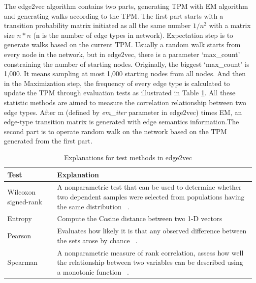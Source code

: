 The edge2vec algorithm contains two parts, generating \ac{TPM} with \ac{EM} algorithm and generating walks according to the \ac{TPM}. The first part starts with a transition probability matrix initiated as all the same number $1/n^2$ with a matrix size $n * n$ (n is the number of edge types in network). Expectation step is to generate walks based on the current \ac{TPM}. Usually a random walk starts from every node in the network, but in edge2vec, there is a parameter ‘max\_count’ constraining the number of starting nodes. Originally, the biggest ‘max\_count’ is 1,000. It means sampling at most 1,000 starting nodes from all nodes. And then in the Maximization step, the frequency of every edge type is calculated to update the \ac{TPM} through evaluation tests as illustrated in Table \ref{tab:tests in edge2vec}. All these statistic methods are aimed to measure the correlation relationship between two edge types. After m (defined by \textit{em\_iter} parameter in edge2vec) times \ac{EM}, an edge-type transition matrix is generated with edge semantics information.The second part is to operate random walk on the network based on the \ac{TPM} generated from the first part. 

\begin{table}[!ht]
    \centering
    \begin{tabular}{|p{3cm}|p{9cm}|}
        \hline
        \textbf{Test} & \textbf{Explanation} \\
        \hline
        Wilcoxon signed-rank & A nonparametric test that can be used to determine whether two dependent samples were selected from populations having the same distribution ~\cite{dagostino_wilcoxon_2008}.\\
        \hline
        Entropy & Compute the Cosine distance between two 1-D vectors\\
        \hline
        Pearson & Evaluates how likely it is that any observed difference between the sets arose by chance ~\cite{rogers_toward_1963}.\\
        \hline
        Spearman & A nonparametric measure of rank correlation, assess how well the relationship between two variables can be described using a monotonic function ~\cite{kotz_spearman_2006}.\\
        \hline
    \end{tabular}
    \captionsetup{justification=centering}
    \caption{Explanations for test methods in edge2vec}
    \label{tab:tests in edge2vec}
\end{table}


